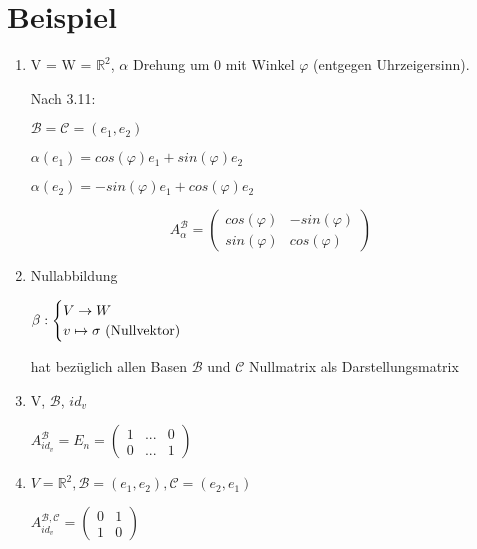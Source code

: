 \documentclass[a4paper, openany]{book}
\begin{document}
        \section{Beispiel}

        \begin{enumerate}[label=(\alph*)]
          \item V = W = $\mathbb{R}^2$, $\alpha$ Drehung um 0 mit Winkel $\varphi$ (entgegen Uhrzeigersinn).

          Nach 3.11:

          $\mathcal{B} = \mathcal{C} = (e_1, e_2)$

          $\alpha(e_1) = cos(\varphi)e_1 + sin(\varphi) e_2$

          $\alpha(e_2) = -sin(\varphi)e_1 + cos(\varphi)e_2$

          \par \medskip

          \begin{equation}
            A_{\alpha}^{\mathcal{B}} = \begin{pmatrix} cos(\varphi) & -sin(\varphi) \\ sin(\varphi) & cos(\varphi) \end{pmatrix}
          \end{equation}

          \item Nullabbildung

          $\beta : \begin{cases}V \rightarrow W \\ v \mapsto \sigma \textnormal{ (Nullvektor)} \end{cases}$

          hat bezüglich allen Basen $\mathcal{B}$ und $\mathcal{C}$ Nullmatrix als Darstellungsmatrix

          \item V, $\mathcal{B}$, $id_v$

          $A_{id_v}^{\mathcal{B}} = E_n = \begin{pmatrix}1 & ... & 0 \\ 0 & ... & 1 \end{pmatrix}$

          \item $V = \mathbb{R}^2, \mathcal{B} = (e_1, e_2), \mathcal{C} = (e_2, e_1)$

          $A_{id_v}^{\mathcal{B, C}} = \begin{pmatrix}0 & 1 \\  1 & 0 \end{pmatrix}$


\end{enumerate}
\end{document}
